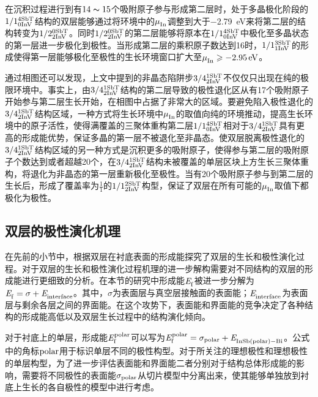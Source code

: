 在沉积过程进行到有$14\thicksim 15$个吸附原子参与形成第二层时，处于多晶极化阶段的$\rm 1/1{}_{0InV}^{4SbT} \it$结构的双层能够通过将环境中的$\it \mu_{\rm In}^{\rm } \it$调整到大于\SI{-2.79}{\electronvolt}来将第二层的结构转变为$\rm 1/2{}_{2InV}^{0SbT} \it$。同时$\rm 1/2{}_{2InV}^{0SbT} \it$的第二层能够将原本在$\rm 1/1{}_{0InV}^{4SbT} \it$中极化至多晶状态的第一层进一步极化到极性。当形成第二层的乘积原子数达到16时，$\rm 1/1{}_{1InV}^{3SbT} \it$的形成使得第一层能够极化至极性的生长环境窗口扩大至$\it \mu_{\rm In}^{\rm } \it \geqslant \SI{-2.95}{\electronvolt}$。

通过相图还可以发现，上文中提到的非晶态陷阱步$\rm 3/4{}_{2InV}^{1SbT} \it$不仅仅只出现在纯的极限环境中。事实上，由$\rm 3/4{}_{2InV}^{1SbT} \it$结构的第二层导致的极性退化区从有17个吸附原子开始参与第二层生长开始，在相图中占据了非常大的区域。要避免陷入极性退化的$\rm 3/4{}_{2InV}^{1SbT} \it$结构区域，一种方式将生长环境中$\it \mu_{\rm In}^{\rm } \it$的取值向纯的环境推动，提高生长环境中的原子活性，使得满覆盖的三聚体重构第二层$\rm 1/1{}_{0InV}^{4SbT} \it$相对于$\rm 3/4{}_{2InV}^{1SbT} \it$具有更高的形成能优势，保证多晶的第一层不被退化至非晶态。使双层脱离极性退化的$\rm 3/4{}_{2InV}^{1SbT} \it$结构区域的另一种方式是沉积更多的吸附原子，使得参与第二层的吸附原子个数达到或者超越20个，在$\rm 3/4{}_{2InV}^{1SbT} \it$结构未被覆盖的单层区块上方生长三聚体重构，将退化为非晶态的第一层重新极化至极性。当有20个吸附原子参与到第二层的生长后，形成了覆盖率为$\frac{1}{1}$的$\rm 1/1{}_{2InV}^{2SbT} \it$构型，保证了双层在所有可能的$\it \mu_{\rm In}^{\rm } \it$取值下都极化为极性。


\subsection{双层的极性演化机理}

在先前的小节中，根据双层在衬底表面的形成能探究了双层的生长和极性演化过程。对于双层的生长和极性演化过程机理的进一步解构需要对不同结构的双层的形成能进行更细致的分析。在本节的研究中形成能$\it E_{\rm f}^{\rm } \it$被进一步分解为$\it E_{\rm f}^{\rm } \it=\sigma + \it E_{\rm interface}^{\rm } \it$。其中，$\sigma$为表面层与真空层接触面的表面能；$\it E_{\rm interface}^{\rm } \it$为表面层与剩余各层之间的界面能。在这个攻势下，表面能和界面能的竞争决定了各种结构的形成能高低以及双层生长过程中的结构演化倾向。

对于衬底上的单层，形成能$\it E_{\rm f}^{\rm polar} \it$可以写为$\it E_{\rm f}^{\rm polar} \it=\sigma_{\rm polar} + \it E_{\rm InSb\left(polar\right)-Bi}^{\rm } \it$。公式中的角标$\rm polar$用于标识单层不同的极性构型。对于所关注的理想极性和理想极性的单层构型，为了进一步评估表面能和界面能二者分别对于结构总体形成能的影响，需要将不同极性的表面能$\sigma_{\rm polar}$从切片模型中分离出来，使其能够单独放到衬底上生长的各自极性的模型中进行考虑。

